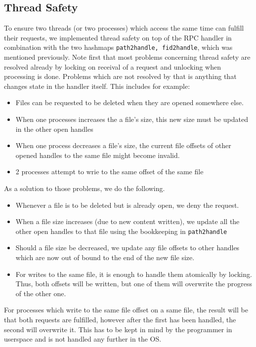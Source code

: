 \subsection{Thread Safety}
To ensure two threads (or two processes) which access the same time can fulfill their requests, we implemented thread safety on top 
of the RPC handler in combination with the two hashmaps \texttt{path2handle, fid2handle}, which was mentioned previously.
Note first that most problems concerning thread safety are resolved already by locking on receival of a request and unlocking when
processing is done. 
Problems which are not resolved by that is anything that changes state in the handler itself. This includes for example:
\begin{itemize}
    \item Files can be requested to be deleted when they are opened somewhere else.
    \item When one processes increases the a file's size, this new size must be updated in the other open handles
    \item When one process decreases a file's size, the current file offsets of other opened handles to the same file might become invalid.
    \item 2 processes attempt to wrie to the same offset of the same file 
\end{itemize}
As a solution to those problems, we do the following.
\begin{itemize}
    \item Whenever a file is to be deleted but is already open, we deny the request.
    \item When a file size increases (due to new content written), we update all the other open handles to that file using the bookkeeping in \texttt{path2handle}
    \item Should a file size be decreased, we update any file offsets to other handles which are now out of bound to the end of the new file size.
    \item For writes to the same file, it is enough to handle them atomically by locking. Thus, both offsets will be written, but one of them 
    will overwrite the progress of the other one.
\end{itemize}

For processes which write to the same file offset on a same file, the result will be that both requests are fulfilled, however
after the first has been handled, the second will overwrite it. This has to be kept in mind by the programmer in userspace and is
not handled any further in the OS.

